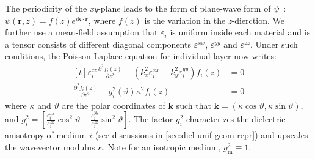 %
The periodicity of the \textit{xy}-plane leads to the form of
plane-wave form of $\psi$~\cite{parsegian_van_2010_book}:
\(\psi(\mathbf{r}, z) =  
f(z) e^{i \mathbf{k} \cdot \mathbf{r}} \),
where \(f(z)\) is the variation in the \emph{z}-dierction.
%
We further use a mean-field assumption that $\varepsilon_{i}$ is
uniform inside each material and is a tensor
consists of different diagonal components \(\varepsilon^{xx}\),
\(\varepsilon^{yy}\) and
\(\varepsilon^{zz}\).
Under such conditions, the Poisson-Laplace equation for individual
layer now writes:
\begin{equation}
  \label{eq:vdw-laplace-2}
  \begin{aligned}[t]
\varepsilon_{i}^{zz} \frac{\partial^{2} f_{i}(z)}{\partial z^{2}}
- (k_{x}^{2} \varepsilon_{i}^{xx} + k_{y}^{2} \varepsilon_{i}^{yy}) f_{i}(z) &= 0    \\
\frac{\partial^{2} f_{i}(z)}{\partial z^{2}}
- g_{i}^{2}(\vartheta) \kappa^{2} f_{i}(z) &= 0
  \end{aligned}
\end{equation}
where $\kappa$ and $\vartheta$ are the polar coordinates of
$\mathbf{k}$ such that
\(\mathbf{k} = (\kappa \cos\mathcal{\vartheta}, \kappa\sin
\mathcal{\vartheta})\), and
\(g_{i}^{2} = {\displaystyle
  [\frac{\varepsilon_{i}^{xx}}{\varepsilon_{i}^{zz}} \cos^{2}
  \vartheta + \frac{\varepsilon_{i}^{yy}}{\varepsilon_{i}^{zz}}
  \sin^{2} \vartheta]}\).
%
The factor \(g_{i}^{2}\) characterizes the dielectric anisotropy of
medium $i$ (see discussions in \autoref{sec:diel-unif-geom-repr}) and
upscales the wavevector modulus \(\kappa\). Note for an isotropic
medium, $g_{\mathrm{m}}^{2}\equiv1$.


